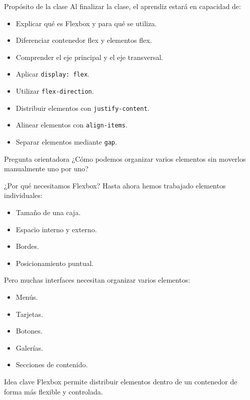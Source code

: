 \documentclass[aspectratio=169,11.5pt]{beamer}
\begin{document}
    \begin{frame}{Propósito de la clase}
        Al finalizar la clase, el aprendiz estará en capacidad de:

        \begin{itemize}
            \item Explicar qué es Flexbox y para qué se utiliza.
            \item Diferenciar contenedor flex y elementos flex.
            \item Comprender el eje principal y el eje transversal.
            \item Aplicar \texttt{display: flex}.
            \item Utilizar \texttt{flex-direction}.
            \item Distribuir elementos con \texttt{justify-content}.
            \item Alinear elementos con \texttt{align-items}.
            \item Separar elementos mediante \texttt{gap}.
        \end{itemize}

        \begin{block}{Pregunta orientadora}
            ¿Cómo podemos organizar varios elementos sin moverlos
            manualmente uno por uno?
        \end{block}
    \end{frame}

    \begin{frame}{¿Por qué necesitamos Flexbox?}
        Hasta ahora hemos trabajado elementos individuales:

        \begin{itemize}
            \item Tamaño de una caja.
            \item Espacio interno y externo.
            \item Bordes.
            \item Posicionamiento puntual.
        \end{itemize}

        Pero muchas interfaces necesitan organizar varios elementos:

        \begin{itemize}
            \item Menús.
            \item Tarjetas.
            \item Botones.
            \item Galerías.
            \item Secciones de contenido.
        \end{itemize}

        \begin{block}{Idea clave}
            Flexbox permite distribuir elementos dentro de un contenedor
            de forma más flexible y controlada.
        \end{block}
    \end{frame}
\end{document}
